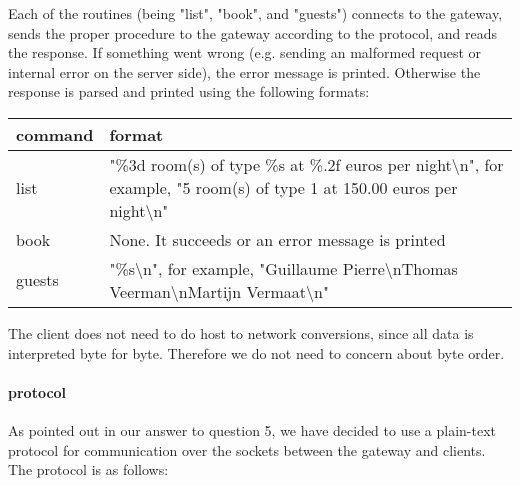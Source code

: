 \documentclass[a4paper,10pt]{article}
\begin{document}
Each of the routines (being "list", "book", and "guests") connects to the gateway, sends the proper procedure to the gateway according to the protocol, and reads the response. If something went wrong (e.g. sending an malformed request or internal error on the server side), the error message is printed. Otherwise the response is parsed and printed using the following formats:

\begin{center}
\begin{tabular}{ l | p{9.3cm} }
\textbf{command} & \textbf{format}\\ \hline
list & "\%3d room(s) of type \%s at \%.2f euros per night\textbackslash n", for example, "5 room(s) of type 1 at 150.00 euros per night\textbackslash n"\\ \hline
book & None. It succeeds or an error message is printed \\ \hline
guests & "\%s\textbackslash n", for example, "Guillaume Pierre\textbackslash nThomas Veerman\textbackslash nMartijn Vermaat\textbackslash n" \\
\end{tabular}
\end{center}

The client does not need to do host to network conversions, since all data is interpreted byte for byte. Therefore we do not need to concern about byte order.

\paragraph{protocol}
As pointed out in our answer to question 5, we have decided to use a plain-text protocol for communication over the sockets between the gateway and clients. The protocol is as follows:
\end{document}
